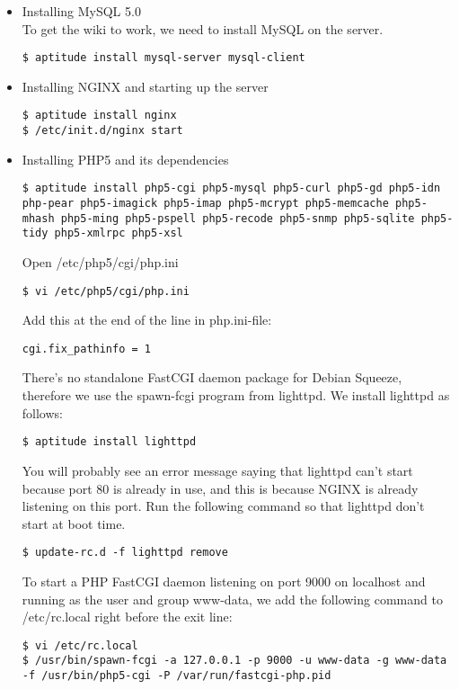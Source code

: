 \begin{itemize}

\item{Installing MySQL 5.0} \\
To get the wiki to work, we need to install MySQL on the server.
\begin{lstlisting}
$ aptitude install mysql-server mysql-client 
\end{lstlisting}

\item{Installing NGINX and starting up the server}
\begin{lstlisting}
$ aptitude install nginx
$ /etc/init.d/nginx start
\end{lstlisting}

\item{Installing PHP5 and its dependencies}
\begin{lstlisting}
$ aptitude install php5-cgi php5-mysql php5-curl php5-gd php5-idn php-pear php5-imagick php5-imap php5-mcrypt php5-memcache php5-mhash php5-ming php5-pspell php5-recode php5-snmp php5-sqlite php5-tidy php5-xmlrpc php5-xsl
\end{lstlisting}
Open /etc/php5/cgi/php.ini
\begin{lstlisting}
$ vi /etc/php5/cgi/php.ini
\end{lstlisting}
Add this at the end of the line in php.ini-file:
\begin{lstlisting}
cgi.fix_pathinfo = 1
\end{lstlisting}
There's no standalone FastCGI daemon package for Debian Squeeze, therefore we use the spawn-fcgi program from lighttpd. We install lighttpd as follows: 
\begin{lstlisting}
$ aptitude install lighttpd
\end{lstlisting}
You will probably see an error message saying that lighttpd can't start because port 80 is already in use, and this is because NGINX is already listening on this port. Run the following command so that lighttpd don't start at boot time.
\begin{lstlisting}
$ update-rc.d -f lighttpd remove
\end{lstlisting}
To start a PHP FastCGI daemon listening on port 9000 on localhost and running as the user and group www-data, we add the following command to /etc/rc.local right before the exit line:
\begin{lstlisting}
$ vi /etc/rc.local
$ /usr/bin/spawn-fcgi -a 127.0.0.1 -p 9000 -u www-data -g www-data -f /usr/bin/php5-cgi -P /var/run/fastcgi-php.pid
\end{lstlisting}


\end{itemize}
